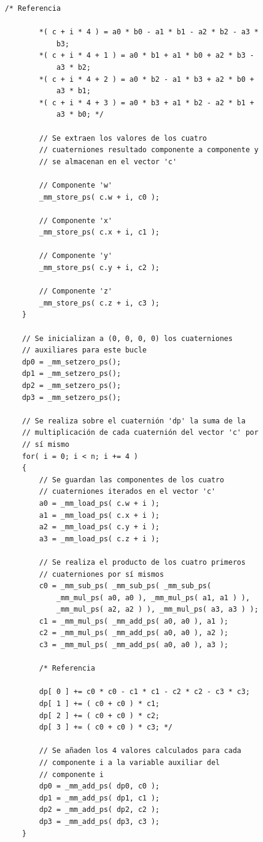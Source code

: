 \documentclass[conference]{IEEEtran}
\begin{document}
\begin{lstlisting}[style=CStyle, title=Código con la ejecución del bucle vectorizada.]
        /* Referencia

        *( c + i * 4 ) = a0 * b0 - a1 * b1 - a2 * b2 - a3 *
            b3;
        *( c + i * 4 + 1 ) = a0 * b1 + a1 * b0 + a2 * b3 -
            a3 * b2;
        *( c + i * 4 + 2 ) = a0 * b2 - a1 * b3 + a2 * b0 +
            a3 * b1;
        *( c + i * 4 + 3 ) = a0 * b3 + a1 * b2 - a2 * b1 +
            a3 * b0; */

        // Se extraen los valores de los cuatro
        // cuaterniones resultado componente a componente y
        // se almacenan en el vector 'c'

        // Componente 'w'
        _mm_store_ps( c.w + i, c0 );

        // Componente 'x'
        _mm_store_ps( c.x + i, c1 );

        // Componente 'y'
        _mm_store_ps( c.y + i, c2 );

        // Componente 'z'
        _mm_store_ps( c.z + i, c3 );
    }

    // Se inicializan a (0, 0, 0, 0) los cuaterniones
    // auxiliares para este bucle
    dp0 = _mm_setzero_ps();
    dp1 = _mm_setzero_ps();
    dp2 = _mm_setzero_ps();
    dp3 = _mm_setzero_ps();

    // Se realiza sobre el cuaternión 'dp' la suma de la
    // multiplicación de cada cuaternión del vector 'c' por
    // sí mismo
    for( i = 0; i < n; i += 4 )
    {
        // Se guardan las componentes de los cuatro
        // cuaterniones iterados en el vector 'c'
        a0 = _mm_load_ps( c.w + i );
        a1 = _mm_load_ps( c.x + i );
        a2 = _mm_load_ps( c.y + i );
        a3 = _mm_load_ps( c.z + i );

        // Se realiza el producto de los cuatro primeros
        // cuaterniones por sí mismos
        c0 = _mm_sub_ps( _mm_sub_ps( _mm_sub_ps(
            _mm_mul_ps( a0, a0 ), _mm_mul_ps( a1, a1 ) ),
            _mm_mul_ps( a2, a2 ) ), _mm_mul_ps( a3, a3 ) );
        c1 = _mm_mul_ps( _mm_add_ps( a0, a0 ), a1 );
        c2 = _mm_mul_ps( _mm_add_ps( a0, a0 ), a2 );
        c3 = _mm_mul_ps( _mm_add_ps( a0, a0 ), a3 );

        /* Referencia

        dp[ 0 ] += c0 * c0 - c1 * c1 - c2 * c2 - c3 * c3;
        dp[ 1 ] += ( c0 + c0 ) * c1;
        dp[ 2 ] += ( c0 + c0 ) * c2;
        dp[ 3 ] += ( c0 + c0 ) * c3; */

        // Se añaden los 4 valores calculados para cada
        // componente i a la variable auxiliar del
        // componente i
        dp0 = _mm_add_ps( dp0, c0 );
        dp1 = _mm_add_ps( dp1, c1 );
        dp2 = _mm_add_ps( dp2, c2 );
        dp3 = _mm_add_ps( dp3, c3 );
    }


\end{lstlisting}
\end{document}
